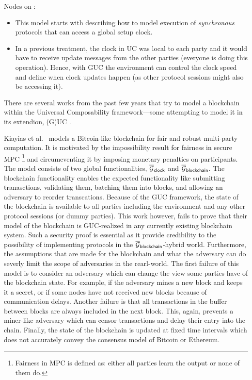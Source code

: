 Nodes on \cite{kiayias2016fair}:

\begin{itemize}
    \item This model starts with describing how to model execution of \emph{synchronous} protocols that can access a global setup clock.
    \item In a previous treatment, the clock in UC was local to each party and it would have to receive update messages from the other parties (everyone is doing this operation). Hence, with GUC the environment can control the clock speed and define when clock updates happen (as other protocol sessions might also be accessing it).
\end{itemize}

There are several works from the past few years that try to model a blockchain within the Universal Composability framework---some attempting to model it in its extendion, (G)UC \cite{uc, guc}.

Kiayias et al.~\cite{kiayias2016fair} models a Bitcoin-like blockchain for fair and robust multi-party computation.
It is motivated by the impossibility result for fairness in secure MPC \footnote{Fairness in MPC is defined as: either all parties learn the output or none of them do.} and circumeventing it by imposing monetary penalties on participants.
The model consists of two global functionalities, ${\overline{\mathcal{G}}}_{{\mathsf {clock}}}$ and ${\overline{\mathcal{G}}}_{{\mathsf {blockchain}}}$.
The blockchain functionality enables the expected functionality like submitting tranasctions, validating them, batching them into blocks, and allowing an adversary to reorder transcations.
Because of the GUC framework, the state of the blockchain is available to all parties including the environment and any other protocol sessions (or dummy parties).
This work however, fails to prove that their model of the blockchain is GUC-realized in any currently existing blockchain system.
Such a security proof is essential as it provide credibility to the possibility of implementing protocols in the ${\overline{\mathcal{G}}}_{{\mathsf {blockchain}}}$-hybrid world.
Furthermore, the assumptions that are made for the blockchain and what the adversary can do severly limit the scope of adversaries in the rearl-world.
The first failure of this model is to consider an adversary which can change the view some parties have of the blockchain state.
For example, if the adversary mines a new block and keeps it a secret, or if some nodes have not received new blocks because of communication delays.
Another failure is that all transactions in the buffer between blocks are always included in the next block.
This, again, prevents a miner-like adversary which can censor transactions and delay their entry into the chain.
Finally, the state of the blockchain is updated at fixed time intervals which does not accurately convey the consensus model of Bitcoin or Ethereum.

